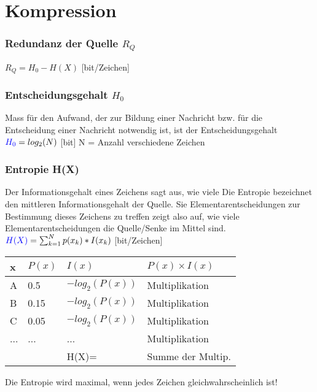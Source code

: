 
\section{Kompression}


\subsubsection{Redundanz der Quelle $R_Q$}
\colorbox{lightlightgrey}{$R_Q = H_0 - H(X)$} [bit/Zeichen]\\

\subsubsection{Entscheidungsgehalt $H_0$}
Mass für den Aufwand, der zur Bildung einer Nachricht bzw. für die Entscheidung einer Nachricht notwendig ist, ist der Entscheidungsgehalt\\
\colorbox{lightlightgrey}{$\textcolor{blue}{H_0} = log_2(N)$} [bit]
N = Anzahl verschiedene Zeichen\\

\subsubsection{Entropie H(X)}
Der Informationsgehalt eines Zeichens sagt aus, wie viele Die Entropie bezeichnet den mittleren Informationsgehalt der Quelle. Sie Elementarentscheidungen zur Bestimmung dieses Zeichens zu treffen zeigt also auf, wie viele Elementarentscheidungen die Quelle/Senke im Mittel sind.
\colorbox{lightlightgrey}{$\textcolor{blue}{H(X)} = \sum_{k = 1}^{N}p(x_k) * I(x_k)$} [bit/Zeichen]\\
\begin{center}
\begin{tabular}{l | l | l | l}
    \hline
    x   & $P(x)$    & $I(x)$                  & $P(x) \times I(x)$\\ \hline
    A   & 0.5       & $-log_2(P(x))$          &  Multiplikation\\
    B   & 0.15      & $-log_2(P(x))$          &  Multiplikation\\
    C   & 0.05      & $-log_2(P(x))$          &  Multiplikation\\
    ... & ...       & ...                     &  Multiplikation\\
    \hline
    \hline
        &           &  H(X)=     & Summe der Multip.\\
\end{tabular}
\end{center}
Die Entropie wird maximal, wenn jedes Zeichen gleichwahrscheinlich ist!

